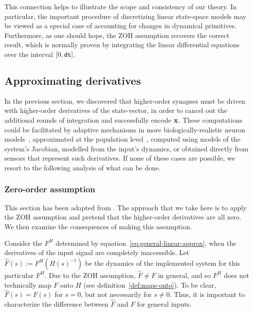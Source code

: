 This connection helps to illustrate the scope and consistency of our theory.
In particular, the important procedure of discretizing linear state-space models may be viewed as a special case of accounting for changes in dynamical primitives.
Furthermore, as one should hope, the ZOH assumption recovers the correct result, which is normally proven by integrating the linear differential equations over the interval $[0\text{,}\, \texttt{dt}{}]$.

\subsection{Approximating derivatives}
\label{sec:derivatives}

In the previous section, we discovered that higher-order synapses must be driven with higher-order derivatives of the state-vector, in order to cancel out the additional rounds of integration and successfully encode $\mathbf{x}$. 
These computations could be facilitated by adaptive mechanisms in more biologically-realistic neuron models~\citep{lundstrom2008fractional}, approximated at the population level~\citep{tripp2010}, computed using models of the system's Jacobian, modelled from the input's dynamics, or obtained directly from sensors that represent such derivatives.
If none of these cases are possible, we resort to the following analysis of what can be done. 

\subsubsection{Zero-order assumption}

This section has been adapted from \citet[][appendix~A.4]{voelker2018}.
The approach that we take here is to apply the ZOH assumption and pretend that the higher-order derivatives are all zero.
We then examine the consequences of making this assumption.

Consider the $F^H$ determined by equation~\ref{eq:general-linear-approx}, when the derivatives of the input signal are completely inaccessible.
Let $\hat{F}(s) := F^{H}(H(s)^{-1})$ be the dynamics of the implemented system for this particular $F^H$.
Due to the ZOH assumption, $\hat{F} \ne F$ in general, and so $F^H$ does not technically map $F$ onto $H$ (see definition~\ref{def:maps-onto}).
To be clear, $\hat{F}(s) = F(s)$ for $s = 0$, but not necessarily for $s \ne 0$.
Thus, it is important to characterize the difference between $\hat{F}$ and $F$ for general inputs.

